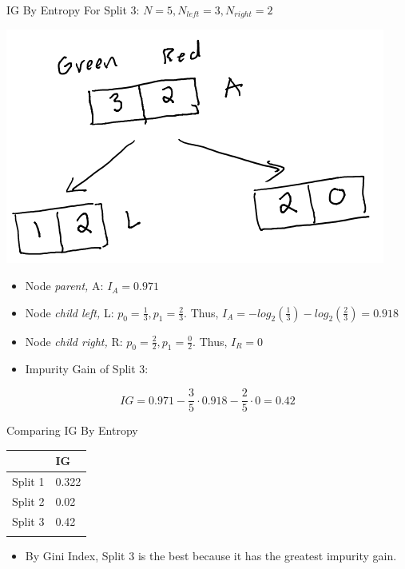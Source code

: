 \documentclass[
  ignorenonframetext,
]{beamer}
\providecommand{\tightlist}{%
  \setlength{\itemsep}{0pt}\setlength{\parskip}{0pt}}\usepackage{longtable,booktabs,array}
\begin{document}
\begin{frame}{IG By Entropy}
\label{ig-by-entropy-2}
For Split 3: \(N = 5, N_{left} =3, N_{right} = 2\)

\includegraphics{images/im2.png}

\begin{itemize}
\item
  Node \emph{parent,} A: \(I_{A} = 0.971\)
\item
  Node \emph{child left,} L: \(p_0 = \frac{1}{3}, p_1 = \frac{2}{3}\).
  Thus, \(I_{A} = -log_2(\frac{1}{3}) -log_2(\frac{2}{3}) = 0.918\)
\item
  Node \emph{child right,} R: \(p_0 = \frac{2}{2}, p_1 = \frac{0}{2}\).
  Thus, \(I_{R} = 0\)
\item
  Impurity Gain of Split 3:
\end{itemize}

\[IG = 0.971 - \frac{3}{5} \cdot 0.918 - \frac{2}{5} \cdot 0 = 0.42\]
\end{frame}

\begin{frame}{Comparing IG By Entropy}
\label{comparing-ig-by-entropy}
\begin{longtable}[]{@{}ll@{}}
\toprule\noalign{}
& IG \\
\midrule\noalign{}
\endhead
Split 1 & 0.322 \\
Split 2 & 0.02 \\
Split 3 & 0.42 \\
\bottomrule\noalign{}
\end{longtable}

\begin{itemize}
\tightlist
\item
  By Gini Index, Split 3 is the best because it has the greatest
  impurity gain.
\end{itemize}
\end{frame}
\end{document}
